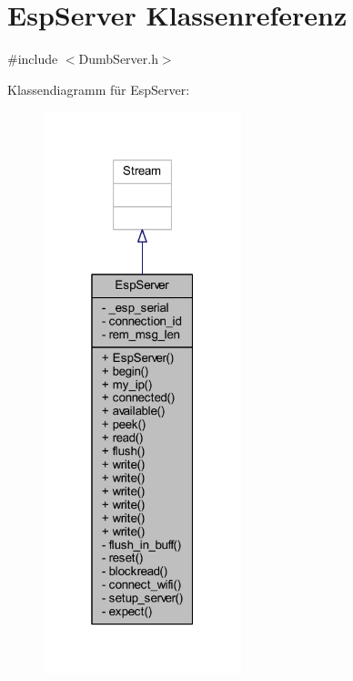 \hypertarget{class_esp_server}{}\section{Esp\+Server Klassenreferenz}
\label{class_esp_server}


{\ttfamily \#include $<$Dumb\+Server.\+h$>$}



Klassendiagramm für Esp\+Server\+:\nopagebreak
\begin{figure}[H]
\begin{center}
\leavevmode
\includegraphics[width=163pt]{class_esp_server__inherit__graph}
\end{center}
\end{figure}


